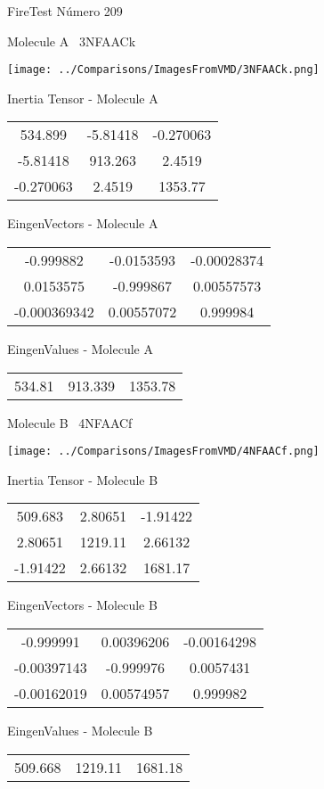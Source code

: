 \vtab[-3cm]
\begin{center}
{\large FireTest \tab Número 209}
\end{center}
\begin{multicols}{2}
\begin{center}

Molecule A \
3NFAACk

\texttt{[image: ../Comparisons/ImagesFromVMD/3NFAACk.png]}

Inertia Tensor - Molecule A \\
\begin{tabular}{|c c c|}
534.899	 & 	-5.81418	 & 	-0.270063	 \\
-5.81418	 & 	913.263	 & 	2.4519	 \\
-0.270063	 & 	2.4519	 & 	1353.77
\end{tabular}

\vtab
 EingenVectors - Molecule A     \\
\begin{tabular}{|c c c|}
-0.999882	 & 	-0.0153593	 & 	-0.00028374	 \\
0.0153575	 & 	-0.999867	 & 	0.00557573	 \\
-0.000369342	 & 	0.00557072	 & 	0.999984
\end{tabular}

\vtab
 EingenValues - Molecule A     \\
\begin{tabular}{|c c c|}
534.81	 & 	913.339	 & 	1353.78	 \\
\end{tabular}
\columnbreak

Molecule B \
4NFAACf

\texttt{[image: ../Comparisons/ImagesFromVMD/4NFAACf.png]}

Inertia Tensor - Molecule B \\
\begin{tabular}{|c c c|}
509.683	 & 	2.80651	 & 	-1.91422	 \\
2.80651	 & 	1219.11	 & 	2.66132	 \\
-1.91422	 & 	2.66132	 & 	1681.17
\end{tabular}

\vtab
 EingenVectors - Molecule B     \\
\begin{tabular}{|c c c|}
-0.999991	 & 	0.00396206	 & 	-0.00164298	 \\
-0.00397143	 & 	-0.999976	 & 	0.0057431	 \\
-0.00162019	 & 	0.00574957	 & 	0.999982
\end{tabular}

\vtab
 EingenValues - Molecule B     \\
\begin{tabular}{|c c c|}
509.668	 & 	1219.11	 & 	1681.18	 \\
\end{tabular}

\end{center}
\end{multicols}

